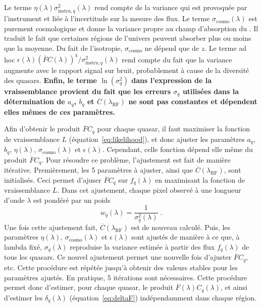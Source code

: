 \documentclass[11pt, twoside, a4paper, openright]{report}
\begin{document}
Le terme $\eta(\lambda)\sigma_{\mathrm{instru}, q}^2(\lambda)$ rend compte de la variance qui est provoquée par l'instrument et liée à l'incertitude sur la mesure des flux. Le terme $\sigma_{\mathrm{cosmo}}(\lambda)$ est purement cosmologique et donne la variance propre au champ d'absorption du \lya{}. Il traduit le fait que certaines régions de l'univers peuvent absorber plus ou moins que la moyenne. Du fait de l'isotropie, $\sigma_{\mathrm{cosmo}}$ ne dépend que de $z$. Le terme ad hoc $\epsilon(\lambda)(\overline F C(\lambda))^4 / \sigma_{\mathrm{instru},q}^2 (\lambda)$ rend compte du fait que la variance augmente avec le rapport signal sur bruit, probablement à cause de la diversité des quasars.  \textbf{Enfin, le terme $\ln (\sigma_q^2)$ dans l'expression de la vraissemblance provient du fait que les erreurs $\sigma_q$ utilisées dans la détermination de $a_q$, $b_q$ et $\overline C(\lambda_{\mathrm{RF}})$ ne sont pas constantes et dépendent elles mêmes de ces paramètres.}

Afin d'obtenir le produit $\overline F C_q$ pour chaque quasar, il faut maximiser la fonction de vraissemblance $L$ (équation~\ref{eq:likelihood}), et donc ajuster les paramètres $a_q$, $b_q$, $\eta(\lambda)$, $\sigma_{\mathrm{cosmo}}(\lambda)$ et $\epsilon(\lambda)$. Cependant, celle fonction dépend elle même du produit $\overline F C_q$. Pour résoudre ce problème, l'ajustement est fait de manière itérative.
Premièrement, les 5 paramètres à ajuster, ainsi que $\overline C(\lambda_{\mathrm{RF}})$, sont initialisés. Ceci permet d'ajuser $\overline F C_q$ sur $f_q(\lambda)$ en maximisant la fonction de vraissemblance $L$. Dans cet ajustement, chaque pixel observé à une longueur d'onde $\lambda$ est pondéré par un poids
\begin{equation}
  \label{eq:weights}
  w_{q}(\lambda) = \frac{1}{\sigma_{q}^2(\lambda)}  \; .
\end{equation}
Une fois cette ajustement fait, $\overline C(\lambda_{\mathrm{RF}})$ est de nouveau calculé. Puis, les paramètres $\eta(\lambda)$, $\sigma_{\mathrm{cosmo}}(\lambda)$ et $\epsilon(\lambda)$ sont ajustés de manière à ce que, à lambda fixé, $\sigma_q(\lambda)$ reproduise la variance estimée à partir des flux $f_q(\lambda)$ de tous les quasars. Ce nouvel ajustement permet une nouvelle fois d'ajuster $\overline F C_q$, etc. Cette procédure est répétée jusqu'à obtenir des valeurs stables pour les paramètres ajustés. En pratique, 5 itérations sont nécessaires. Cette procédure permet donc d'estimer, pour chaque quasar, le produit $\overline F(\lambda) C_q(\lambda)$, et ainsi d'estimer les $\delta_q(\lambda)$ (équation~\ref{eq:deltaF}) indépendamment dans chaque région.
\end{document}
